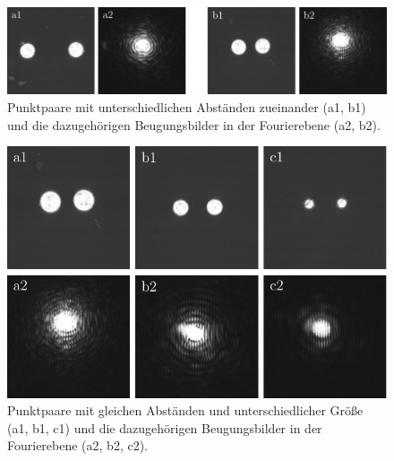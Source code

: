 \begin{figure}[h]
	\centering
	\includegraphics{images/Regina/abb15.pdf}
	\caption[Punktpaare unterschiedlicher Abstände und Fourierspektren]{
		Punktpaare mit unterschiedlichen Abständen zueinander (a1, b1) und die dazugehörigen Beugungsbilder in der Fourierebene (a2, b2).
	}
	\label{fig:punktpaare_verschieden_und_spektren}
\end{figure}


\begin{figure}[h]
	\centering
	\includegraphics{images/Regina/abb16.pdf}
	\caption[Punktpaare gleicher Abstände und Fourierspektren]{
		Punktpaare mit gleichen Abständen und unterschiedlicher Größe (a1, b1, c1) und die dazugehörigen Beugungsbilder in der Fourierebene (a2, b2, c2).
	}
	\label{fig:punktpaare_gleich_und_spektren}
\end{figure}

